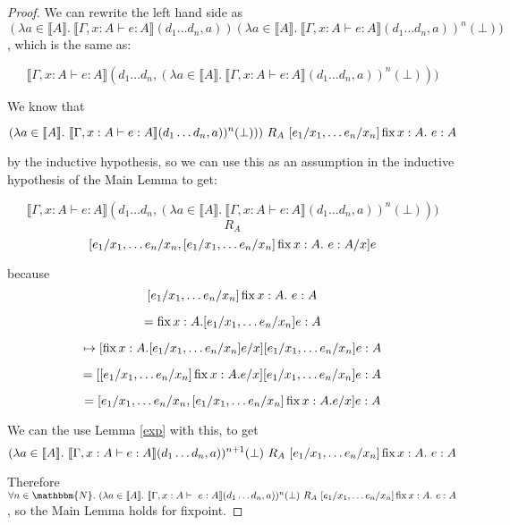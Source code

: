 \begin{proof}
We can rewrite the left hand side as $(\lambda a \in \llbracket A \rrbracket. \ \llbracket \Gamma, x : A \vdash e : A \rrbracket(d_1 \dots d_n,a))(\lambda a \in \llbracket A \rrbracket. \ \llbracket \Gamma, x : A \vdash e : A \rrbracket(d_1 \dots d_n,a))^n(\bot)) $, which is the same as:

\[ \llbracket \Gamma, x : A \vdash e : A \rrbracket(d_1 \dots d_n,(\lambda a \in \llbracket A \rrbracket. \ \llbracket \Gamma, x : A \vdash e : A \rrbracket(d_1 \dots d_n,a))^n(\bot)))\]

We know that 

\[(\lambda a \in \llbracket A \rrbracket. \ \llbracket \Gamma, x : A \vdash e : A \rrbracket(d_1 \dots d_n,a))^n(\bot))) \ R_A \ [e_1/x_1, \dots e_n/x_n]\operatorname{fix} x : A. \ e : A\]

by the inductive hypothesis, so we can use this as an assumption in the inductive hypothesis of the Main Lemma to get:

\[ \llbracket \Gamma, x : A \vdash e : A \rrbracket(d_1 \dots d_n,(\lambda a \in \llbracket A \rrbracket. \ \llbracket \Gamma, x : A \vdash e : A \rrbracket(d_1 \dots d_n,a))^n(\bot)))\]
\[ R_A \]
\[ [e_1/x_1, \dots e_n/x_n, [e_1/x_1, \dots e_n/x_n]\operatorname{fix} x : A. \ e : A/x]e \]

because 
\[[e_1/x_1, \dots e_n/x_n]\operatorname{fix} x : A. \ e : A \]

\[ = \operatorname{fix}  x : A. [e_1/x_1, \dots e_n/x_n]e : A \]

\[\mapsto [\operatorname{fix} x:A. [e_1/x_1, \dots e_n/x_n]e/x][e_1/x_1, \dots e_n/x_n] e : A\]

\[ = [[e_1/x_1, \dots e_n/x_n] \operatorname{fix} x:A. e/x] [e_1/x_1, \dots e_n/x_n] e : A\]

\[ = [e_1/x_1, \dots e_n/x_n, [e_1/x_1, \dots e_n/x_n] \operatorname{fix} x:A. e/x] e : A \]

We can the use Lemma \ref{exp} with this, to get 
\[(\lambda a \in \llbracket A \rrbracket. \ \llbracket \Gamma, x : A \vdash e : A \rrbracket(d_1 \dots d_n,a))^{n+1}(\bot) \ R_A \ [e_1/x_1, \dots e_n/x_n]\fix x : A. \ e : A\]

Therefore $\forall n \in \mathbbm{N}. \ (\lambda a \in \llbracket A \rrbracket. \ \llbracket \Gamma, x : A \vdash \ e : A \rrbracket(d_1 \dots d_n, a))^n(\bot) \ R_A \ [e_1/x_1, \dots e_n/x_n]\fix x : A. \ e : A$, so the Main Lemma holds for fixpoint.






\end{proof}
